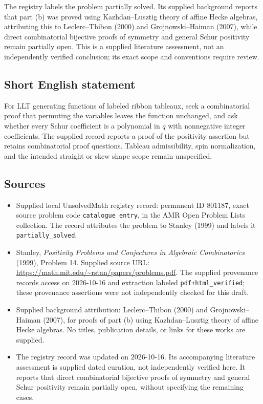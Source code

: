 \documentclass[11pt]{article}
\begin{document}
The registry labels the problem partially solved. Its supplied background reports that part (b) was proved using Kazhdan--Lusztig theory of affine Hecke algebras, attributing this to Leclerc--Thibon (2000) and Grojnowski--Haiman (2007), while direct combinatorial bijective proofs of symmetry and general Schur positivity remain partially open. This is a supplied literature assessment, not an independently verified conclusion; its exact scope and conventions require review.
\subsection{Short English statement}
For LLT generating functions of labeled ribbon tableaux, seek a combinatorial proof that permuting the variables leaves the function unchanged, and ask whether every Schur coefficient is a polynomial in \(q\) with nonnegative integer coefficients. The supplied record reports a proof of the positivity assertion but retains combinatorial proof questions. Tableau admissibility, spin normalization, and the intended straight or skew shape scope remain unspecified.
\subsection{Sources}
\begin{itemize}
\item Supplied local UnsolvedMath registry record: permanent ID \(801187\), exact source problem code \texttt{catalogue entry}, in the AMR Open Problem Lists collection. The record attributes the problem to Stanley (1999) and labels it \texttt{partially\_solved}.
\item Stanley, \emph{Positivity Problems and Conjectures in Algebraic Combinatorics} (1999), Problem 14. Supplied source URL: \url{https://math.mit.edu/~rstan/papers/problems.pdf}. The supplied provenance records access on 2026-10-16 and extraction labeled \texttt{pdf+html\_verified}; these provenance assertions were not independently checked for this draft.
\item Supplied background attribution: Leclerc--Thibon (2000) and Grojnowski--Haiman (2007), for proofs of part (b) using Kazhdan--Lusztig theory of affine Hecke algebras. No titles, publication details, or links for these works are supplied.
\item The registry record was updated on 2026-10-16. Its accompanying literature assessment is supplied dated curation, not independently verified here. It reports that direct combinatorial bijective proofs of symmetry and general Schur positivity remain partially open, without specifying the remaining cases.
\end{itemize}
\end{document}

